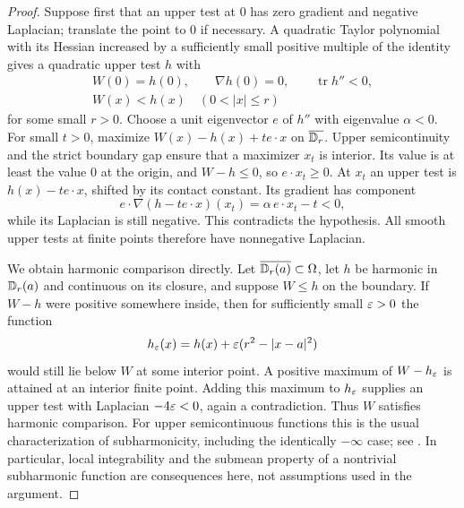 \begin{proof}
Suppose first that an upper test at $0$ has zero gradient and
negative Laplacian; translate the point to $0$ if necessary.  A
quadratic Taylor polynomial with its Hessian increased by a
sufficiently small positive multiple of the identity gives a
quadratic upper test $h$ with
\[
 \begin{gathered}
 W(0)=h(0),\qquad \nabla h(0)=0,\qquad
 \operatorname{tr}h''<0,\\
 W(x)<h(x)\quad(0<|x|\le r)
 \end{gathered}
\]
for some small $r>0$.  Choose a unit eigenvector $e$ of $h''$ with
eigenvalue $\alpha<0$.  For small $t>0$, maximize
$W(x)-h(x)+t e\cdot x$ on $\overline{\mathbb D_r}$.  Upper
semicontinuity and the strict boundary gap ensure that a maximizer
$x_t$ is interior.  Its value is at least the value $0$ at the
origin, and $W-h\le0$, so $e\cdot x_t\ge0$.  At $x_t$ an upper
test is $h(x)-t e\cdot x$, shifted by its contact constant.  Its
gradient has component
\[
 e\cdot\nabla(h-t e\cdot x)(x_t)
 =\alpha\, e\cdot x_t-t<0,
\]
while its Laplacian is still negative.  This contradicts the
hypothesis.  All smooth upper tests at finite points therefore
have nonnegative Laplacian.

We obtain harmonic comparison directly.  Let
$\overline{\mathbb D_r(a)}\subset\Omega$, let $h$ be harmonic in
$\mathbb D_r(a)$ and continuous on its closure, and suppose $W\le h$ on
the boundary.  If $W-h$ were positive somewhere inside, then for
sufficiently small $\varepsilon>0$ the function
\[
 h_\varepsilon(x)=h(x)+\varepsilon(r^2-|x-a|^2)
\]
would still lie below $W$ at some interior point.  A positive
maximum of $W-h_\varepsilon$ is attained at an interior finite point.
Adding this maximum to $h_\varepsilon$ supplies an upper test with
Laplacian $-4\varepsilon<0$, again a contradiction.  Thus $W$ satisfies
harmonic comparison.  For upper semicontinuous functions this is
the usual characterization of subharmonicity, including the
identically $-\infty$ case; see \cite[Chapter~2]{Ransford1995}.
In particular, local integrability
and the submean property of a nontrivial subharmonic function are
consequences here, not assumptions used in the argument.
\end{proof}


